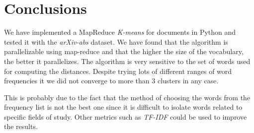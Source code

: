 \setlength{\parskip}{1em plus 0.5em minus 0.2em}





\section*{Conclusions}

We have implemented a MapReduce \emph{K-means} for documents in Python and tested it
with the \emph{arXiv-abs} dataset. We have found that the algorithm is
parallelizable using map-reduce and that the higher the size of the vocabulary, the
better it parallelizes. The algorithm is very sensitive to the set of words
used for computing the distances. Despite trying lots of different ranges of word frequencies it
we did not converge to more than 3 clusters in any case.

This is probably due to the fact that the method of choosing the words from the frequency list
is not the best one since it is difficult to isolate words related to specific fields of study.
Other metrics such as \emph{TF-IDF} could be used to improve the results.


